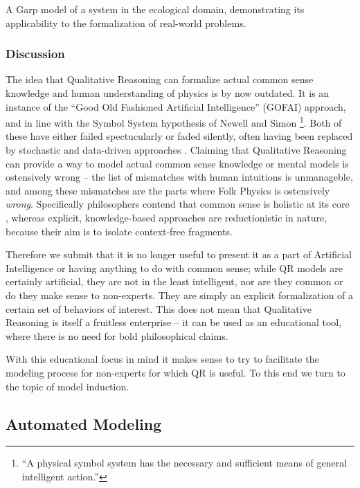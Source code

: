 \documentclass{article} %
\begin{document}
A Garp model of a system in the ecological domain, demonstrating its
applicability to the formalization of real-world problems.


\subsubsection{Discussion}

The idea that Qualitative Reasoning can formalize actual common sense knowledge
and human understanding of physics is by now outdated. It is an instance of the
``Good Old Fashioned Artificial Intelligence'' (GOFAI) approach,
\cite{haugeland} and in line with the Symbol System hypothesis of Newell and
Simon \cite{newell}\footnote{``A physical symbol system has the necessary and
sufficient means of general intelligent action.''}.  Both of these have either
failed spectucularly or faded silently, often having been replaced by
stochastic and data-driven approaches \cite{russellnorvig}.  Claiming that
Qualitative Reasoning can provide a way to model actual common sense knowledge
or mental models is ostensively wrong -- the list of mismatches with human
intuitions is unmanageble, and among these mismatches are the parts where Folk
Physics is ostensively {\em wrong}. Specifically philosophers contend that
common sense is holistic at its core \cite{smith}, whereas explicit,
knowledge-based approaches are reductionistic in nature, because their aim is
to isolate context-free fragments. 

Therefore we submit that it is no longer useful to present it as a part of
Artificial Intelligence or having anything to do with common sense; while QR
models are certainly artificial, they are not in the least intelligent, nor are
they common or do they make sense to non-experts.  They are simply an explicit
formalization of a certain set of behaviors of interest. This does not mean
that Qualitative Reasoning is itself a fruitless enterprise -- it can be used
as an educational tool, where there is no need for bold philosophical claims.

With this educational focus in mind it makes sense to try to facilitate the
modeling process for non-experts for which QR is useful. To this end we turn
to the topic of model induction.

\subsection{Automated Modeling} %
\end{document}
